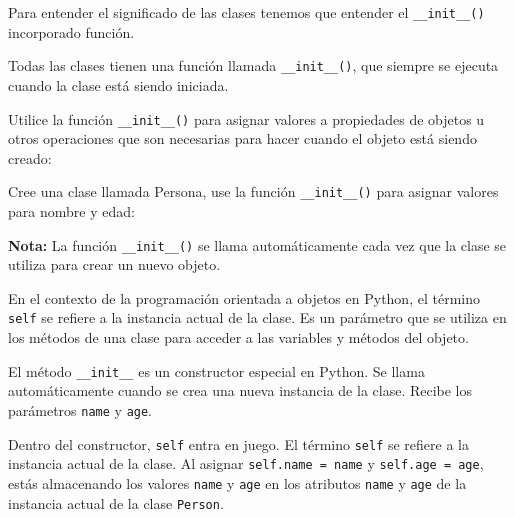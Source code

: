 Para entender el significado de las clases tenemos que entender el
\texttt{\_\_init\_\_()} incorporado función.

Todas las clases tienen una función llamada \texttt{\_\_init\_\_()}, que
siempre se ejecuta cuando la clase está siendo iniciada.

Utilice la función \texttt{\_\_init\_\_()} para asignar valores a
propiedades de objetos u otros operaciones que son necesarias para hacer
cuando el objeto está siendo creado:

\begin{code}
Cree una clase llamada Persona, use la función \texttt{\_\_init\_\_()} para asignar valores para nombre y edad:

\begin{Shaded}
\begin{Highlighting}[]
   \NormalTok{(}
    \OperatorTok{=}
    \OperatorTok{=}

\OperatorTok{=}\NormalTok{, }\NormalTok{)}


\end{Highlighting}
\end{Shaded}
\end{code}

\textbf{Nota:} La función \texttt{\_\_init\_\_()} se llama
automáticamente cada vez que la clase se utiliza para crear un nuevo
objeto.

En el contexto de la programación orientada a objetos en Python, el
término \texttt{self} se refiere a la instancia actual de la clase. Es
un parámetro que se utiliza en los métodos de una clase para acceder a
las variables y métodos del objeto.

El método \texttt{\_\_init\_\_} es un constructor especial en Python. Se
llama automáticamente cuando se crea una nueva instancia de la clase.
Recibe los parámetros \texttt{name} y \texttt{age}.

Dentro del constructor, \texttt{self} entra en juego. El término
\texttt{self} se refiere a la instancia actual de la clase. Al asignar
\texttt{self.name\ =\ name} y \texttt{self.age\ =\ age}, estás
almacenando los valores \texttt{name} y \texttt{age} en los atributos
\texttt{name} y \texttt{age} de la instancia actual de la clase
\texttt{Person}.

